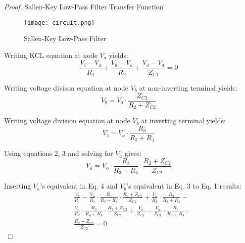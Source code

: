 \documentclass{article}
\begin{document}
\begin{proof}
Sallen-Key Low-Pass Filter Transfer Function \\

\begin{figure}
\centering
\texttt{[image: circuit.png]}
\caption{Sallen-Key Low-Pass Filter}
\label{fig:my_label}
\end{figure}

Writing KCL equation at node \begin{math} V_a \end{math} yields:
\begin{equation} 
\frac{V_i - V_a}{R_1} +  \frac{V_b - V_a}{R_2} + \frac{V_o - V_a}{Z_{C1}} = 0
\end{equation}

Writing voltage divison equation at node \begin{math} V_b \end{math} at non-inverting terminal yields:
\begin{equation}
V_b = V_a  \cdot \frac{Z_{C2}}{R_2 + Z_{C2}} 
\end{equation}

Writing voltage division equation at node \begin{math} V_b \end{math} at inverting terminal yields:
\begin{equation}
V_b = V_o \cdot \frac{R_3}{R_3 + R_4}
\end{equation}

Using equations 2, 3 and solving for \begin{math} V_a \end{math} gives:
\begin{equation}
V_a = V_o \cdot \frac{R_3}{R_3 + R_4} \cdot \frac{R_2 + Z_{C2}}{Z_{C2}}
\end{equation}

Inserting \begin{math} V_a \end{math}'s equivalent in Eq. 4 and \begin{math} V_b \end{math}'s equivalent in Eq. 3 to Eq. 1 results:
\begin{equation}
\begin{aligned}
& \frac{V_i}{R_1} - \frac{V_o}{R_1} \cdot \frac{R_3}{R_3 + R_4} \cdot \frac{R_2 + Z_{C2}}{Z_{C2}} + \frac{V_o}{R_2} \cdot \frac{R_3}{R_3 + R_4} - \\
& \frac{V_o}{R_2} \cdot \frac{R_3}{R_3 + R_4} \cdot \frac{R_2 + Z_{C2}}{Z_{C2}} + \frac{V_o}{Z_{C1}} - \frac{V_o}{Z_{C1}}  \cdot \frac{R_3}{R_3 + R_4} \cdot \\
& \frac{R_2 + Z_{C2}}{Z_{C2}} = 0
\end {aligned}
\end{equation}



\end{proof}
\end{document}
